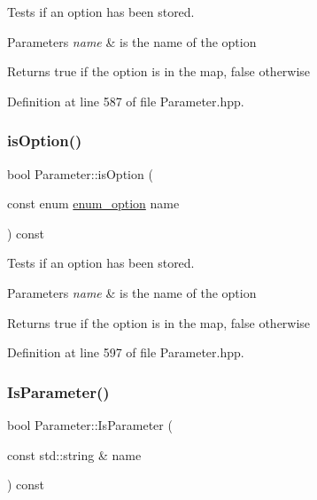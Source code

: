 Tests if an option has been stored. 


\begin{DoxyParams}{Parameters}
{\em name} & is the name of the option \\
\hline
\end{DoxyParams}
\begin{DoxyReturn}{Returns}
true if the option is in the map, false otherwise 
\end{DoxyReturn}


Definition at line 587 of file Parameter.\+hpp.

\mbox{\label{classParameter_a80acdc0e87f17966884da0f3f6988302}} 
\subsubsection{\texorpdfstring{is\+Option()}{isOption()}\hspace{0.1cm}{\footnotesize\ttfamily [3/3]}}
{\footnotesize\ttfamily bool Parameter\+::is\+Option (\begin{DoxyParamCaption}\item[{const enum \hyperlink{Parameter_8hpp_a6d9441db52e537f5588658b218875976}{enum\+\_\+option}}]{name }\end{DoxyParamCaption}) const\hspace{0.3cm}{\ttfamily [inline]}}



Tests if an option has been stored. 


\begin{DoxyParams}{Parameters}
{\em name} & is the name of the option \\
\hline
\end{DoxyParams}
\begin{DoxyReturn}{Returns}
true if the option is in the map, false otherwise 
\end{DoxyReturn}


Definition at line 597 of file Parameter.\+hpp.

\mbox{\label{classParameter_ae14866e22c9cb375eca050a31a697bea}} 
\subsubsection{\texorpdfstring{Is\+Parameter()}{IsParameter()}}
{\footnotesize\ttfamily bool Parameter\+::\+Is\+Parameter (\begin{DoxyParamCaption}\item[{const std\+::string \&}]{name }\end{DoxyParamCaption}) const}



